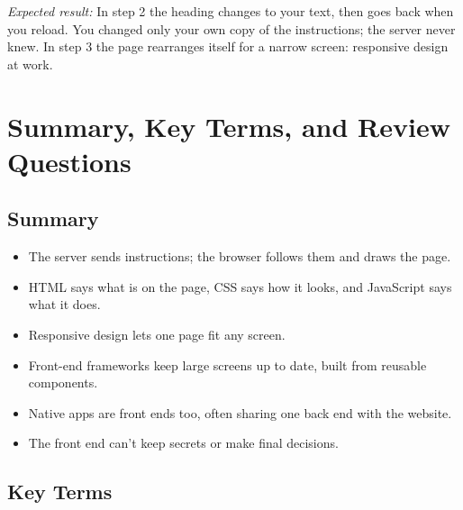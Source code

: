 \emph{Expected result:} In step 2 the heading changes to your text, then goes back when you reload. You changed only your own copy of the instructions; the server never knew. In step 3 the page rearranges itself for a narrow screen: responsive design at work.

\section{Summary, Key Terms, and Review Questions}\label{02-the-front-end:summary-key-terms-and-review-questions}

\subsection*{Summary}\label{02-the-front-end:summary}

\begin{itemize}
\tightlist
\item
  The server sends instructions; the browser follows them and draws the page.
\item
  HTML says what is on the page, CSS says how it looks, and JavaScript says what it does.
\item
  Responsive design lets one page fit any screen.
\item
  Front-end frameworks keep large screens up to date, built from reusable components.
\item
  Native apps are front ends too, often sharing one back end with the website.
\item
  The front end can't keep secrets or make final decisions.
\end{itemize}


\subsection*{Key Terms}\label{02-the-front-end:key-terms}

